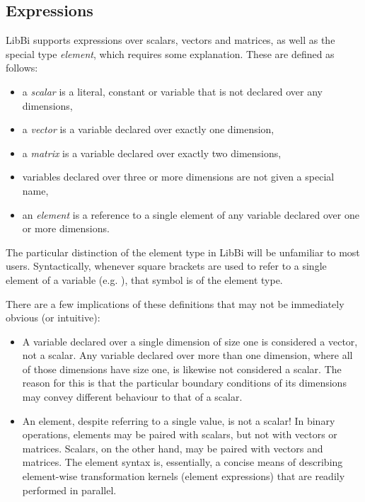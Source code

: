 \subsection{Expressions\label{Expressions}}

LibBi supports expressions over scalars, vectors and matrices, as well as the
special type \textit{element}, which requires some explanation. These are
defined as follows:
\begin{itemize}
\item a \textit{scalar} is a literal, constant or variable that
  is not declared over any dimensions,
\item a \textit{vector} is a variable declared over
  exactly one dimension,
\item a \textit{matrix} is a variable declared over exactly two
  dimensions,
\item variables declared over three or more dimensions are not given a special
  name,
\item an \textit{element} is a reference to a single element of any
  variable declared over one or more dimensions.
\end{itemize}

The particular distinction of the element type in LibBi will be unfamiliar to
most users. Syntactically, whenever square brackets are used to refer to a
single element of a variable (e.g. ), that symbol is of the
element type.

There are a few implications of these definitions that may not be immediately
obvious (or intuitive):
\begin{itemize}
\item A variable declared over a single dimension of size one is considered a
  vector, not a scalar. Any variable declared over more than one dimension,
  where all of those dimensions have size one, is likewise not considered a
  scalar. The reason for this is that the particular boundary conditions of
  its dimensions may convey different behaviour to that of a scalar.

\item An element, despite referring to a single value, is not a scalar! In
  binary operations, elements may be paired with scalars, but not with vectors
  or matrices. Scalars, on the other hand, may be paired with vectors and
  matrices. The element syntax is, essentially, a concise means of describing
  element-wise transformation kernels (element expressions) that are readily performed in parallel.

\end{itemize}

